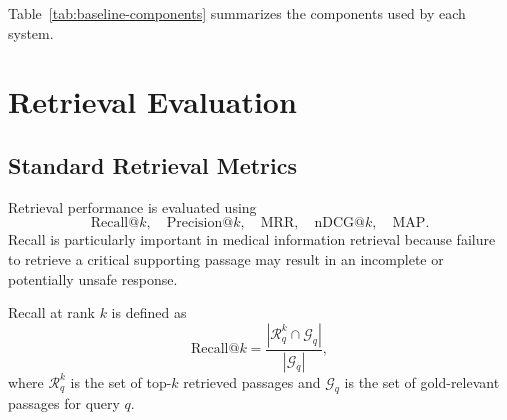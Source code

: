 \documentclass{article}
\begin{document}
Table~\ref{tab:baseline-components} summarizes the components used by each 
system.
\begin{table}[t]
    \centering
    \caption{Component-level comparison of the evaluated systems.}
    \label{tab:baseline-components}
\end{table}

\section{Retrieval Evaluation}
\subsection{Standard Retrieval Metrics}
Retrieval performance is evaluated using
\begin{equation}
    \mathrm{Recall@}k,\quad
    \mathrm{Precision@}k,\quad
    \mathrm{MRR},\quad
    \mathrm{nDCG@}k,\quad
    \mathrm{MAP}.
\end{equation}
Recall is particularly important in medical information retrieval because failure to retrieve a critical supporting passage may result in an incomplete or potentially unsafe response.

Recall at rank $k$ is defined as
\begin{equation}
    \mathrm{Recall@}k
    =
    \frac{
    |\mathcal{R}_q^{k} \cap \mathcal{G}_q|
    }{
    |\mathcal{G}_q|
    },
\end{equation}
where $\mathcal{R}_q^{k}$ is the set of top-$k$ retrieved passages and $\mathcal{G}_q$ is the set of gold-relevant passages for query $q$.
\end{document}
